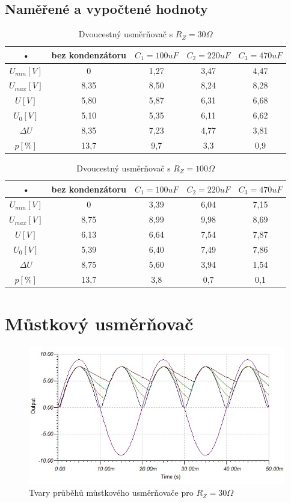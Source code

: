 \documentclass[12pt]{article} %
\begin{document}
\subsection{Naměřené a vypočtené hodnoty}
\begin{table}[H]
\center
\begin{tabular}{|c|c|c|c|c|}
\hline 
• & bez kondenzátoru & $C_1 = 100uF$ & $C_2 = 220uF$ & $C_3 = 470uF$ \\ 
\hline 
$U_{min} [V]$ & 0 & 1,27 & 3,47 & 4,47 \\ 
\hline 
$U_{max} [V]$ & 8,35 & 8,50 & 8,24 & 8,28 \\ 
\hline 
$U [V]$ & 5,80 & 5,87 & 6,31 & 6,68 \\ 
\hline 
$U_0 [V]$ & 5,10 & 5,35 & 6,11 & 6,62 \\ 
\hline 
$\Delta U$ & 8,35 & 7,23 & 4,77 & 3,81 \\ 
\hline 
$p [\%]$ & 13,7 & 9,7 & 3,3 & 0,9 \\ 
\hline 
\end{tabular}
\caption{Dvoucestný usměrňovač s $R_Z=30\Omega$}
\end{table}

\begin{table}[H]
\center
\begin{tabular}{|c|c|c|c|c|}
\hline 
• & bez kondenzátoru & $C_1 = 100uF$ & $C_2 = 220uF$ & $C_3 = 470uF$ \\ 
\hline 
$U_{min} [V]$ & 0 & 3,39 & 6,04 & 7,15 \\ 
\hline 
$U_{max} [V]$ & 8,75 & 8,99 & 9,98 & 8,69 \\ 
\hline 
$U [V]$ & 6,13 & 6,64 & 7,54 & 7,87 \\ 
\hline 
$U_0 [V]$ & 5,39 & 6,40 & 7,49 & 7,86 \\ 
\hline 
$\Delta U$ & 8,75 & 5,60 & 3,94 & 1,54 \\ 
\hline 
$p [\%]$ & 13,7 & 3,8 & 0,7 & 0,1 \\ 
\hline 
\end{tabular}
\caption{Dvoucestný usměrňovač s $R_Z=100\Omega$}
\end{table}

\section{Můstkový usměrňovač}
\begin{figure}[H]
\center
\includegraphics[scale=0.6]{mustkovy30.jpg}
\caption{Tvary průběhů můstkového usměrňovače pro $R_Z = 30\Omega$}
\end{figure}
\end{document}
